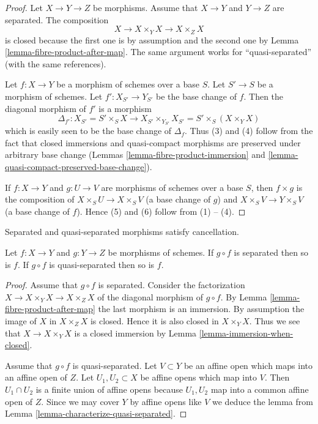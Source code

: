 \begin{proof}
Let $X \to Y \to Z$ be morphisms. Assume that $X \to Y$ and
$Y \to Z$ are separated. The composition
$$
X \to X \times_Y X \to X \times_Z X
$$
is closed because the first one is by assumption and the second
one by Lemma \ref{lemma-fibre-product-after-map}. The same argument
works for ``quasi-separated'' (with the same references).

\medskip\noindent
Let $f : X \to Y$ be a morphism of schemes over a base $S$.
Let $S' \to S$ be a morphism of schemes. Let $f' : X_{S'} \to Y_{S'}$
be the base change of $f$. Then the diagonal morphism
of $f'$ is a morphism
$$
\Delta_{f'} :
X_{S'} = S' \times_S X
\longrightarrow
X_{S'} \times_{Y_{S'}} X_{S'} = S' \times _S (X \times_Y X)
$$
which is easily seen to be the base change of $\Delta_f$.
Thus (3) and (4) follow from the fact that
closed immersions and quasi-compact morphisms are preserved
under arbitrary base change (Lemmas
\ref{lemma-fibre-product-immersion} and
\ref{lemma-quasi-compact-preserved-base-change}).

\medskip\noindent
If $f : X \to Y$ and $g : U \to V$ are morphisms of schemes over a base $S$,
then $f \times g$ is the composition of $X \times_S U \to X \times_S V$
(a base change of $g$) and $X \times_S V \to Y \times_S V$ (a base change
of $f$). Hence (5) and (6) follow from (1) -- (4).
\end{proof}

\begin{lemma}
\label{lemma-compose-after-separated}
\begin{slogan}
Separated and quasi-separated morphisms satisfy cancellation.
\end{slogan}
Let $f : X \to Y$ and $g : Y \to Z$ be morphisms of schemes.
If $g \circ f$ is separated then so is $f$.
If $g \circ f$ is quasi-separated then so is $f$.
\end{lemma}

\begin{proof}
Assume that $g \circ f$ is separated.
Consider the factorization $X \to X \times_Y X \to X \times_Z X$
of the diagonal morphism of $g \circ f$.
By Lemma \ref{lemma-fibre-product-after-map}
the last morphism is an immersion. By assumption the image
of $X$ in $X \times_Z X$ is closed. Hence it is also closed
in $X \times_Y X$. Thus we see that $X \to X \times_Y X$
is a closed immersion by Lemma \ref{lemma-immersion-when-closed}.

\medskip\noindent
Assume that $g \circ f$ is quasi-separated.
Let $V \subset Y$ be an affine open which maps into an affine
open of $Z$. Let $U_1, U_2 \subset X$ be affine opens which
map into $V$. Then $U_1 \cap U_2$ is a finite union of affine
opens because $U_1, U_2$ map into a common affine open
of $Z$. Since we may cover $Y$ by affine opens like $V$ we
deduce the lemma from Lemma \ref{lemma-characterize-quasi-separated}.
\end{proof}

